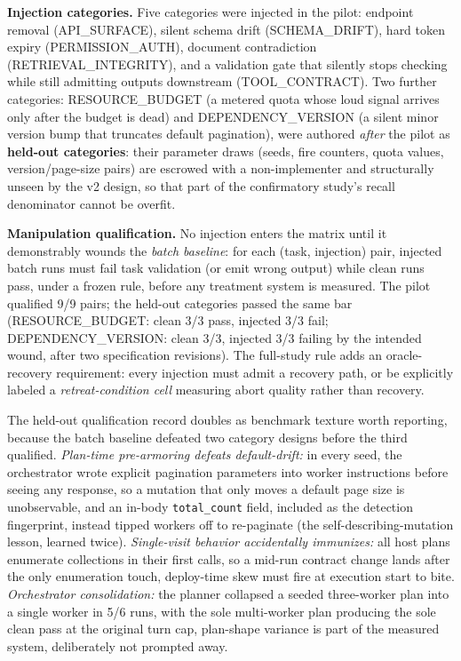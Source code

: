 \documentclass[acmsmall,screen,review,anonymous]{acmart}
\begin{document}
\textbf{Injection categories.} Five categories were injected in the pilot: endpoint removal (API\_SURFACE), silent schema drift (SCHEMA\_DRIFT), hard token expiry (PERMISSION\_AUTH), document contradiction (RETRIEVAL\_INTEGRITY), and a validation gate that silently stops checking while still admitting outputs downstream (TOOL\_CONTRACT). Two further categories: RESOURCE\_BUDGET (a metered quota whose loud signal arrives only after the budget is dead) and DEPENDENCY\_VERSION (a silent minor version bump that truncates default pagination), were authored \emph{after} the pilot as \textbf{held-out categories}: their parameter draws (seeds, fire counters, quota values, version/page-size pairs) are escrowed with a non-implementer and structurally unseen by the v2 design, so that part of the confirmatory study's recall denominator cannot be overfit.

\textbf{Manipulation qualification.} No injection enters the matrix until it demonstrably wounds the \emph{batch baseline}: for each (task, injection) pair, injected batch runs must fail task validation (or emit wrong output) while clean runs pass, under a frozen rule, before any treatment system is measured. The pilot qualified 9/9 pairs; the held-out categories passed the same bar (RESOURCE\_BUDGET: clean 3/3 pass, injected 3/3 fail; DEPENDENCY\_VERSION: clean 3/3, injected 3/3 failing by the intended wound, after two specification revisions). The full-study rule adds an oracle-recovery requirement: every injection must admit a recovery path, or be explicitly labeled a \emph{retreat-condition cell} measuring abort quality rather than recovery.

The held-out qualification record doubles as benchmark texture worth reporting, because the batch baseline defeated two category designs before the third qualified. \emph{Plan-time pre-armoring defeats default-drift:} in every seed, the orchestrator wrote explicit pagination parameters into worker instructions before seeing any response, so a mutation that only moves a default page size is unobservable, and an in-body \texttt{total\_count} field, included as the detection fingerprint, instead tipped workers off to re-paginate (the self-describing-mutation lesson, learned twice). \emph{Single-visit behavior accidentally immunizes:} all host plans enumerate collections in their first calls, so a mid-run contract change lands after the only enumeration touch, deploy-time skew must fire at execution start to bite. \emph{Orchestrator consolidation:} the planner collapsed a seeded three-worker plan into a single worker in 5/6 runs, with the sole multi-worker plan producing the sole clean pass at the original turn cap, plan-shape variance is part of the measured system, deliberately not prompted away.
\end{document}
